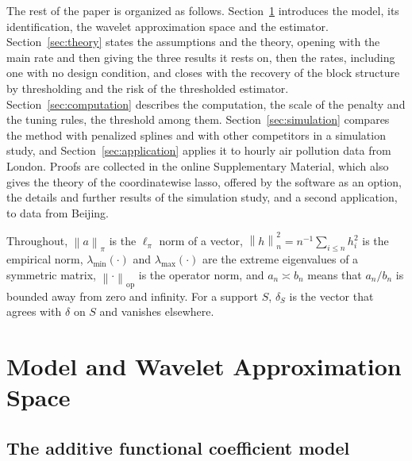 \documentclass[12pt]{article} %
\theoremstyle{definition}
\theoremstyle{plain}
\newcommand{\norm}[1]{\left\lVert #1 \right\rVert}
\newcommand{\normn}[1]{\left\lVert #1 \right\rVert_{n}}
\newcommand{\lmin}{\lambda_{\min}}
\newcommand{\lmaxx}{\lambda_{\max}}
\newcommand{\opnorm}[1]{\left\lVert #1 \right\rVert_{\mathrm{op}}}
\begin{document}
The rest of the paper is organized as follows. Section~\ref{sec:model}
introduces the model, its identification, the wavelet \textcolor{colR1}{approximation space} and the estimator.
Section~\ref{sec:theory} states the assumptions and the theory, opening with
the main rate and then giving the three results it rests on\textcolor{colR1}{, then
the rates, including one with no design condition,} \textcolor{colR1}{and
closes with the recovery of the block structure by thresholding} \textcolor{colR1}{and
the risk of the thresholded estimator}.
Section~\ref{sec:computation} describes the computation, the scale of the
penalty and the tuning rules\textcolor{colR1}{, the threshold among them}.
\textcolor{colR1}{Section~\ref{sec:simulation} compares the method with penalized
splines and with other competitors in a simulation study, and
Section~\ref{sec:application} applies it to hourly air pollution data from
London.} Proofs are collected in the online Supplementary
Material\textcolor{colR1}{, which also gives the theory of the coordinatewise lasso,
offered by the software as an option}\textcolor{colR1}{, the details and further
results of the simulation study, and a second application, to data from
Beijing}.

Throughout, $\norm{a}_\pi$ is the $\ell_\pi$ norm of a vector,
$\normn{h}^2 = n^{-1}\sum_{i\le n} h_i^2$ is the empirical norm,
$\lmin(\cdot)$ and $\lmaxx(\cdot)$ are the extreme eigenvalues of a symmetric
matrix, $\opnorm{\cdot}$ is the operator norm, and $a_n \asymp b_n$ means that
$a_n/b_n$ is bounded away from zero and infinity. For a support
$S$, $\delta_S$ is the vector that agrees with $\delta$ on $S$ and vanishes
elsewhere.

\section{Model and Wavelet \texorpdfstring{\textcolor{colR1}{Approximation Space}}{Approximation Space}}
\label{sec:model}

\subsection{The additive functional coefficient model}
\label{sec:model-def}
\end{document}
